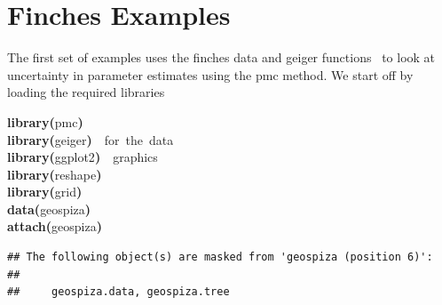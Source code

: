 \documentclass{elsarticle}
\makeatletter
\newcommand{\hlfunctioncall}[1]{\textcolor[rgb]{.5,0,.33}{\textbf{#1}}}%
\newcommand{\hlkeyword}[1]{\textbf{#1}}%
\newcommand{\hlcomment}[1]{\textcolor[rgb]{.18,.6,.34}{#1}}%
\newcommand{\hlsymbol}[1]{#1}%
\newcommand{\hlstd}[1]{\textcolor[rgb]{0,0,0}{#1}}%
\newenvironment{kframe}{%
 \def\FrameCommand##1{\hskip\@totalleftmargin \hskip-\fboxsep
 \colorbox{shadecolor}{##1}\hskip-\fboxsep
     \hskip-\linewidth \hskip-\@totalleftmargin \hskip\columnwidth}%
 \MakeFramed {\advance\hsize-\width
   \@totalleftmargin\z@ \linewidth\hsize
   \@setminipage}}%
 {\par\unskip\endMakeFramed}
\newenvironment{knitrout}{}{} %
\makeatother
\begin{document}

\section{Finches Examples}

The first set of examples uses the finches data and geiger functions~\citep{Harmon2008} to look at uncertainty in parameter estimates using the pmc method.  We start off by loading the required libraries 
\begin{knitrout}
\color{fgcolor}\begin{kframe}
\begin{flushleft}
\ttfamily\noindent
\hlfunctioncall{library}\hlkeyword{(}\hlsymbol{pmc}\hlkeyword{)}\hspace*{\fill}\\
\hlstd{}\hlfunctioncall{library}\hlkeyword{(}\hlsymbol{geiger}\hlkeyword{)}{\ }{\ }\hlcomment{\usebox{\hlnormalsizeboxhash}{\ }for{\ }the{\ }data}\hspace*{\fill}\\
\hlstd{}\hlfunctioncall{library}\hlkeyword{(}\hlsymbol{ggplot2}\hlkeyword{)}{\ }{\ }\hlcomment{\usebox{\hlnormalsizeboxhash}graphics}\hspace*{\fill}\\
\hlstd{}\hlfunctioncall{library}\hlkeyword{(}\hlsymbol{reshape}\hlkeyword{)}\hspace*{\fill}\\
\hlstd{}\hlfunctioncall{library}\hlkeyword{(}\hlsymbol{grid}\hlkeyword{)}\hspace*{\fill}\\
\hlstd{}\hlfunctioncall{data}\hlkeyword{(}\hlsymbol{geospiza}\hlkeyword{)}\hspace*{\fill}\\
\hlstd{}\hlfunctioncall{attach}\hlkeyword{(}\hlsymbol{geospiza}\hlkeyword{)}\mbox{}
\normalfont
\end{flushleft}
\begin{verbatim}
## The following object(s) are masked from 'geospiza (position 6)':
## 
##     geospiza.data, geospiza.tree
\end{verbatim}
\end{kframe}
\end{knitrout}
\end{document}
